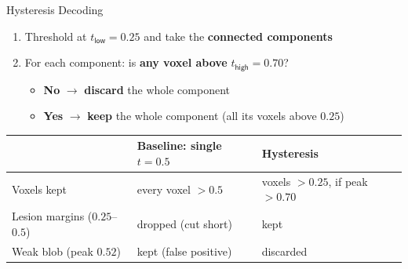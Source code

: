 \documentclass[aspectratio=169,11pt]{beamer}
\begin{document}
\begin{frame}{Hysteresis Decoding}
\vspace{0.5em}
\begin{enumerate}\setlength\itemsep{1.2em}
  \item Threshold at $t_{\textsf{low}}=0.25$ and take the \textbf{connected components}
  \item For each component: is \textbf{any voxel above} $t_{\textsf{high}}=0.70$?
  \begin{itemize}\setlength\itemsep{0.5em}
    \item \textbf{No} $\rightarrow$ \textcolor{kclred}{\textbf{discard}} the whole component
    \item \textbf{Yes} $\rightarrow$ \textcolor{upgreen}{\textbf{keep}} the whole component (all its voxels above $0.25$)
  \end{itemize}
\end{enumerate}
\vspace{1em}
\begin{center}
\footnotesize
\renewcommand{\arraystretch}{1.3}
\begin{tabular}{@{}lll@{}}
\toprule
 & \textbf{Baseline:} single $t=0.5$ & \textbf{Hysteresis} \\
\midrule
Voxels kept & every voxel $>0.5$ & voxels $>0.25$, if peak $>0.70$ \\
Lesion margins ($0.25$--$0.5$) & \textcolor{kclred}{dropped (cut short)} & \textcolor{upgreen}{kept} \\
Weak blob (peak $0.52$) & \textcolor{kclred}{kept (false positive)} & \textcolor{upgreen}{discarded} \\
\bottomrule
\end{tabular}
\end{center}
\end{frame}
\end{document}

